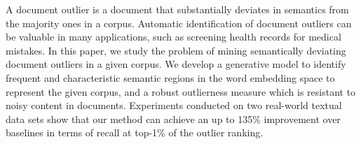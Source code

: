A document outlier is a document that substantially deviates in semantics from the majority ones in a corpus.              Automatic identification of document outliers can be valuable in many applications, such as screening health records for medical mistakes.  In this paper, we study the problem of mining semantically deviating document outliers in a given corpus.              We develop a generative model to identify frequent and characteristic semantic regions in the word embedding space to represent the given corpus, and a robust outlierness measure which is resistant to noisy content in documents.  Experiments conducted on two real-world textual data sets show that our method can achieve an up to 135\% improvement over baselines in terms of recall at top-1\% of the outlier ranking.
